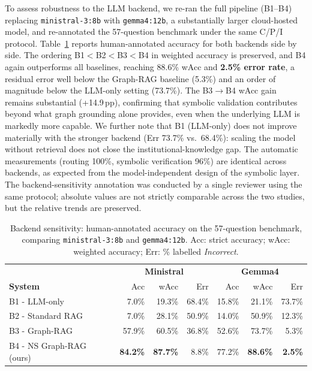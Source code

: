\documentclass[12pt]{article}
\begin{document}
To assess robustness to the LLM backend, we re-ran the full pipeline (B1--B4) replacing \texttt{ministral-3:8b} with \texttt{gemma4:12b}, a substantially larger cloud-hosted model, and re-annotated the 57-question benchmark under the same C/P/I protocol. Table~\ref{tab:backend} reports human-annotated accuracy for both backends side by side. The ordering B1$<$B2$<$B3$<$B4 in weighted accuracy is preserved, and B4 again outperforms all baselines, reaching 88.6\% wAcc and \textbf{2.5\% error rate}, a residual error well below the Graph-RAG baseline (5.3\%) and an order of magnitude below the LLM-only setting (73.7\%). The B3$\to$B4 wAcc gain remains substantial (+14.9\,pp), confirming that symbolic validation contributes beyond what graph grounding alone provides, even when the underlying LLM is markedly more capable. We further note that B1 (LLM-only) does not improve materially with the stronger backend (Err 73.7\% vs.\ 68.4\%): scaling the model without retrieval does not close the institutional-knowledge gap. The automatic measurements (routing 100\%, symbolic verification 96\%) are identical across backends, as expected from the model-independent design of the symbolic layer. The backend-sensitivity annotation was conducted by a single reviewer using the same protocol; absolute values are not strictly comparable across the two studies, but the relative trends are preserved.

\begin{table}[ht]
\centering
\caption{Backend sensitivity: human-annotated accuracy on the 57-question benchmark, comparing \texttt{ministral-3:8b} and \texttt{gemma4:12b}. Acc: strict accuracy; wAcc: weighted accuracy; Err: \% labelled \textit{Incorrect}.}
\label{tab:backend}
\begin{tabular}{lrrrrrr}
\hline
 & \multicolumn{3}{c}{\textbf{Ministral}} & \multicolumn{3}{c}{\textbf{Gemma4}} \\
\textbf{System} & Acc & wAcc & Err & Acc & wAcc & Err \\
\hline
B1 - LLM-only          & 7.0\%  & 19.3\% & 68.4\% & 15.8\% & 21.1\% & 73.7\% \\
B2 - Standard RAG      & 7.0\%  & 28.1\% & 50.9\% & 14.0\% & 50.9\% & 12.3\% \\
B3 - Graph-RAG         & 57.9\% & 60.5\% & 36.8\% & 52.6\% & 73.7\% & 5.3\%  \\
B4 - NS Graph-RAG (ours) & \textbf{84.2\%} & \textbf{87.7\%} & 8.8\% & 77.2\% & \textbf{88.6\%} & \textbf{2.5\%} \\
\hline
\end{tabular}
\end{table}
\end{document}

